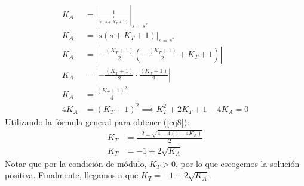 \documentclass[
  11pt,
  letterpaper,
   addpoints,
   answers
  ]{exam}
\begin{document}
\begin{questions}
\begin{solution}
\begin{align}
    K_A &= \left|\frac{1}{\frac{1}{s(s+K_T + 1)}}\right|_{s=s^*} \nonumber \\
    K_A &= \left|s(s+K_T + 1)\right|_{s=s^*} \nonumber\\
    K_A &= \left|-\frac{(K_T+1)}{2}\left(-\frac{(K_T+1)}{2} + K_T + 1 \right)\right| \nonumber\\
    K_A &= \left|-\frac{(K_T+1)}{2} \cdot \frac{(K_T + 1)}{2}\right| \nonumber \\
    K_A &= \frac{(K_T+1)^2}{4} \nonumber \\
    4K_A &= (K_T + 1)^2 \implies \boxed{K_T^2 + 2K_T + 1 - 4K_A = 0}\label{eq8} 
\end{align}
Utilizando la fórmula general para obtener (\ref{eq8}):
\begin{align}
    K_T &= \frac{-2 \pm \sqrt{4-4(1-4K_A)}}{2} \nonumber\\
    K_T &= -1\pm 2\sqrt{K_A} \label{eq9}
\end{align}
Notar que por la condición de módulo, \( K_T > 0 \), por lo que escogemos la solución positiva. Finalmente, llegamos a que \( K_T = -1 + 2\sqrt{K_A} \).

\end{solution}
\end{questions}
\end{document}
